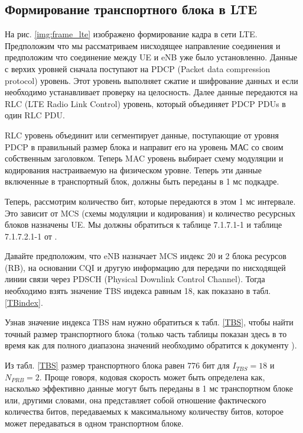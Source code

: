 \subsection{Формирование транспортного блока в LTE} \label{sect1_2_3}

На рис. \ref{img:frame_lte} изображено формирование кадра в сети LTE. Предположим что мы рассматриваем нисходящее направление соединения и предположим что соединение между UE и eNB уже было установленно. Данные с верхих уровней сначала поступают на PDCP (Packet data compression protocol) уровень. Этот уровень выполняет сжатие и шифрование данных и если необходимо устанавливает проверку на целосность. Далее данные передаются на RLC (LTE Radio Link Control) уровень, который объединяет PDCP PDUs в один RLC PDU.

RLC уровень объединит или сегментирует данные, поступающие от уровня PDCP в правильный размер блока и направит его на уровень МАС со своим собственным заголовком. Теперь MAC уровень выбирает схему модуляции и кодирования настраиваемую на физическом уровне. Теперь эти данные включенные в транспортный блок, должны быть переданы в 1 мс подкадре.

Теперь, рассмотрим количество бит, которые передаются в этом 1 мс интервале. Это зависит от MCS (схемы модуляции и кодирования) и количество ресурсных блоков назначены UE. Мы должны обратиться к таблице 7.1.7.1-1 и таблице 7.1.7.2.1-1 от \cite{3GPPTS36213}.

Давайте предположим, что eNB назначает MCS индекс 20 и 2 блока ресурсов (RB), на основании CQI и другую информацию для передачи по нисходящей линии связи через PDSCH (Physical Downlink Control Channel). Тогда необходимо взять значение TBS индекса равным 18, как показано в табл. \ref{TBindex}.

Узнав значение индекса TBS нам нужно обратиться к табл. \ref{TBS}, чтобы найти точный размер транспортного блока (только часть таблицы показан здесь в то время как для полного диапазона значений необходимо обратится к документу \cite{3GPPTS36213}).

Из табл. \ref{TBS} размер транспортного блока равен 776 бит для $I_{TBS}=18$ и  $N_{PRB}=2$. Проще говоря, кодовая скорость может быть определена как, насколько эффективно данные могут быть переданы в 1 мс транспортном блоке или, другими словами, она представляет собой отношение фактического количества битов, передаваемых к максимальному количеству битов, которое может передаваться в одном транспортном блоке.




